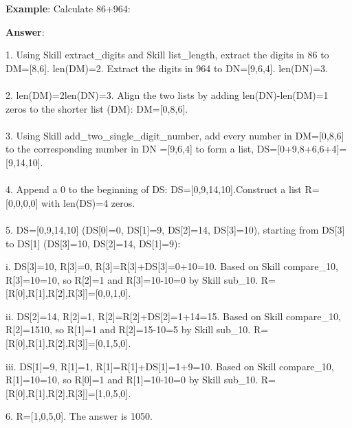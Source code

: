 \documentclass{article} \usepackage{arxiv}
\begin{document}
\newpage

\begin{tcolorbox}[title = {An Example of Skill Composition for Addition}, colback = Apricot!25!white, colframe = BrickRed!75!black] 
\textbf{Example}: Calculate 86+964: 

\quad

\textbf{Answer}:

1. Using Skill extract\_digits and Skill list\_length, extract the digits in 86 to DM=[8,6]. len(DM)=2. Extract the digits in 964 to DN=[9,6,4]. len(DN)=3. \\ \\
2. len(DM)=2len(DN)=3. Align the two lists by adding len(DN)-len(DM)=1 zeros to the shorter list (DM): DM=[0,8,6]. \\ \\
3. Using Skill add\_two\_single\_digit\_number, add every number in DM=[0,8,6] to the corresponding number in DN =[9,6,4] to form a list, DS=[0+9,8+6,6+4]=[9,14,10]. \\ \\
4. Append a 0 to the beginning of DS: DS=[0,9,14,10].Construct a list R=[0,0,0,0] with len(DS)=4 zeros.  \\ \\
5.  DS=[0,9,14,10] (DS[0]=0, DS[1]=9, DS[2]=14, DS[3]=10), starting from DS[3] to DS[1] (DS[3]=10, DS[2]=14, DS[1]=9): 

\quad 

    \qquad i. DS[3]=10, R[3]=0, R[3]=R[3]+DS[3]=0+10=10. Based on Skill compare\_10, R[3]=10=10, so R[2]=1 and R[3]=10-10=0 by Skill sub\_10. R=[R[0],R[1],R[2],R[3]]=[0,0,1,0]. 

    
    \qquad ii. DS[2]=14, R[2]=1, R[2]=R[2]+DS[2]=1+14=15. Based on Skill compare\_10, R[2]=1510, so R[1]=1 and R[2]=15-10=5 by Skill sub\_10. R=[R[0],R[1],R[2],R[3]]=[0,1,5,0]. 

    
     \qquad iii. DS[1]=9, R[1]=1, R[1]=R[1]+DS[1]=1+9=10. Based on Skill compare\_10, R[1]=10=10, so R[0]=1 and R[1]=10-10=0 by Skill sub\_10. R=[R[0],R[1],R[2],R[3]]=[1,0,5,0]. 

\quad 

6. R=[1,0,5,0]. The answer is 1050.           
\end{tcolorbox}
\noindent\begin{minipage}{\textwidth}
 \label{Tab:compose_simple_add_skill}
\end{minipage}
\end{document}
